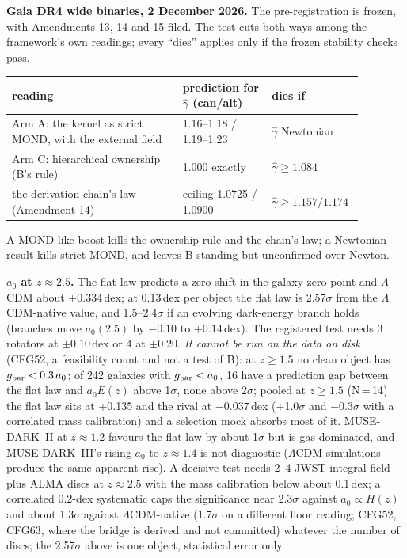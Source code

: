 \documentclass[10pt]{article}
\begin{document}
\textbf{Gaia DR4 wide binaries, 2 December 2026.} The pre-registration is frozen, with Amendments 13, 14 and 15 filed. The test cuts both ways among the framework's own readings; every ``dies'' applies only if the frozen stability checks pass.
\begin{center}\small
\begin{tabular}{p{0.46\linewidth}p{0.24\linewidth}p{0.18\linewidth}}
\toprule
reading & prediction for $\hat\gamma$ (can/alt) & dies if \\
\midrule
Arm A: the kernel as strict MOND, with the external field & 1.16--1.18 / 1.19--1.23 & $\hat\gamma$ Newtonian \\
Arm C: hierarchical ownership (B's rule) & 1.000 exactly & $\hat\gamma\ge1.084$ \\
the derivation chain's law (Amendment 14) & ceiling 1.0725 / 1.0900 & $\hat\gamma\ge1.157/1.174$ \\
\bottomrule
\end{tabular}
\end{center}
A MOND-like boost kills the ownership rule and the chain's law; a Newtonian result kills strict MOND, and leaves B standing but unconfirmed over Newton.

\textbf{$a_0$ at $z\approx2.5$.} The flat law predicts a zero shift in the galaxy zero point and $\Lambda$CDM about +0.334\,dex; at 0.13\,dex per object the flat law is 2.57$\sigma$ from the $\Lambda$CDM-native value, and 1.5--2.4$\sigma$ if an evolving dark-energy branch holds (branches move $a_0(2.5)$ by $-0.10$ to $+0.14$\,dex). The registered test needs 3 rotators at $\pm0.10$\,dex or 4 at $\pm0.20$. \emph{It cannot be run on the data on disk} (CFG52, a feasibility count and not a test of B): at $z\ge1.5$ no clean object has $g_{\rm bar}<0.3\,a_0$; of 242 galaxies with $g_{\rm bar}<a_0$, 16 have a prediction gap between the flat law and $a_0E(z)$ above 1$\sigma$, none above 2$\sigma$; pooled at $z\ge1.5$ (N\,=\,14) the flat law sits at +0.135 and the rival at $-0.037$\,dex (+1.0$\sigma$ and $-0.3\sigma$ with a correlated mass calibration) and a selection mock absorbs most of it. MUSE-DARK~II at $z\approx1.2$ favours the flat law by about 1$\sigma$ but is gas-dominated, and MUSE-DARK~III's rising $a_0$ to $z\approx1.4$ is not diagnostic ($\Lambda$CDM simulations produce the same apparent rise). A decisive test needs 2--4 JWST integral-field plus ALMA discs at $z\approx2.5$ with the mass calibration below about 0.1\,dex; a correlated 0.2-dex systematic caps the significance near 2.3$\sigma$ against $a_0\propto H(z)$ and about 1.3$\sigma$ against $\Lambda$CDM-native (1.7$\sigma$ on a different floor reading; CFG52, CFG63, where the bridge is derived and not committed) whatever the number of discs; the 2.57$\sigma$ above is one object, statistical error only.
\end{document}
